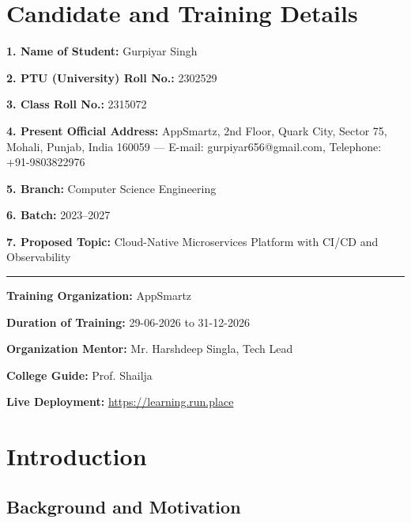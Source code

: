 \documentclass[12pt,a4paper]{article}
\begin{document}
\section*{Candidate and Training Details}

\noindent\textbf{1. Name of Student:} Gurpiyar Singh

\noindent\textbf{2. PTU (University) Roll No.:} 2302529

\noindent\textbf{3. Class Roll No.:} 2315072

\noindent\textbf{4. Present Official Address:} AppSmartz, 2nd Floor, Quark City,
Sector 75, Mohali, Punjab, India 160059 --- E-mail:
gurpiyar656@gmail.com, Telephone: +91-9803822976

\noindent\textbf{5. Branch:} Computer Science Engineering

\noindent\textbf{6. Batch:} 2023--2027

\noindent\textbf{7. Proposed Topic:} Cloud-Native Microservices Platform with CI/CD and Observability

\vspace{0.6cm}
\hrule
\vspace{0.4cm}

\noindent\textbf{Training Organization:} AppSmartz

\noindent\textbf{Duration of Training:} 29-06-2026 to 31-12-2026

\noindent\textbf{Organization Mentor:} Mr. Harshdeep Singla, Tech Lead

\noindent\textbf{College Guide:} Prof. Shailja

\noindent\textbf{Live Deployment:} \url{https://learning.run.place}

\newpage

\tableofcontents
\newpage

\onehalfspacing
\doublespacing

\section{Introduction}

\subsection{Background and Motivation}
\end{document}
